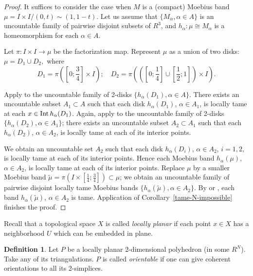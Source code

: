 \documentclass[12pt]{article}
\theoremstyle{definition}
\newtheorem{definition}[theorem]{Definition}
\begin{document}
\begin{proof}
It suffices to consider the case 
when $M$ is a (compact) Moebius band
$\mu = I\times I /  (0,t) \sim (1,1-t)$.
Let us assume that $\{ M_\alpha , \alpha \in A\}$
is an uncountable family
of pairwise disjoint subsets of $R^3$, and
$h_\alpha : \mu \cong M_\alpha $
is a homeomorphism for
each
$\alpha \in A$.

Let $\pi : I\times I \to \mu $
be the factorization map.
Represent
$\mu $ as a union of two disks:
$\mu = D_1 \cup D_2 ,
$
where
$$
D_1 = \pi \left(\left[ 0;\frac34\right] \times I\right);
\quad
D_2 = \pi \left(\left(\left[ 0;\frac14\right] \cup
\left[ \frac12 ; 1\right]\right) \times I\right).
$$

Apply \cite[Lemma 2]{Martin} to the uncountable family of 2-disks
$\{h_\alpha (D_1), \alpha \in A\}$.
There exists an uncountable subset
$A_1\subset A$ such that
each disk
$h_\alpha (D_1)$, $\alpha \in A_1$,
is locally tame at each
$x\in \operatorname{Int} h_\alpha (D_1)$.
Again, apply \cite[Lemma 2]{Martin} to the uncountable family of 2-disks
$\{ h_\alpha (D_2), \alpha \in A_1\}$;
there exists an uncountable subset $A_2\subset A_1$ such that
each
$h_\alpha (D_2)$, $\alpha \in A_2$,
is locally tame at each of its interior points.


We obtain an uncountable
set
$A_2$ such that
each disk
$h_\alpha (D_i)$, $\alpha \in A_2$, $i=1,2$,
is locally tame at each of its interior points.
Hence each Moebius band
$h_\alpha (\mu )$, $\alpha \in A_2$, 
is locally tame at each of its interior points.
Replace $\mu $ by 
a smaller Moebius band
$\tilde\mu  = \pi \left(I \times \left[\frac14 ; \frac34\right]\right) \subset \mu$;
we obtain
an uncountable family
of pairwise disjoint
locally tame
Moebius bands
$\{h_\alpha (\tilde \mu ), \alpha \in A_2\}$.
By
\cite{Bing-loc-tame}
or \cite{Moise-loc-tame},
each 
band
$h_\alpha (\tilde \mu )$, $\alpha \in A_2$
is tame.
Application of Corollary~\ref{tame-N-impossible} finishes the proof.
\end{proof}

Recall that a topological space $X$ is called {\it locally planar} if each point $x\in X$ 
has a neighborhood $U$ which can be embedded
in plane.


\begin{definition}\cite[p.165]{GP}\label{or}
Let $P$ be a locally planar
2-dimensional polyhedron (in some $R^N$). 
Take any of its triangulations.
$P$ is called {\it orientable}
if 
one can give
coherent orientations to
all its 2-simplices.
\end{definition}
\end{document}
